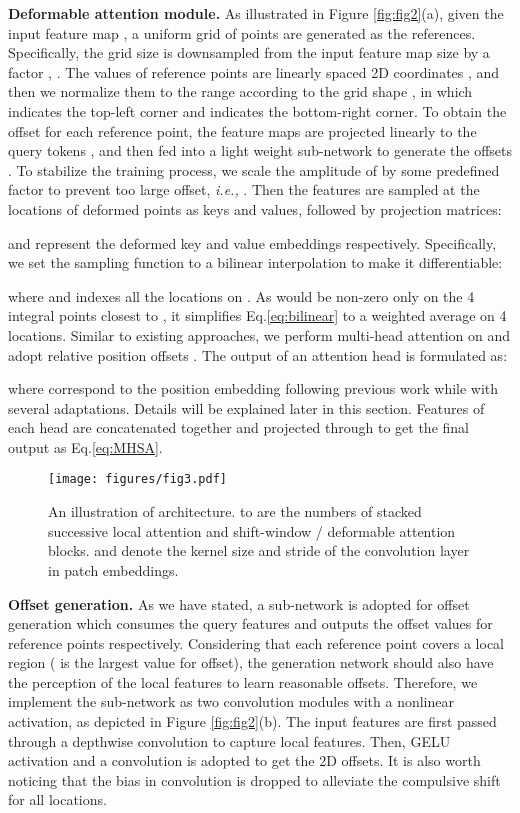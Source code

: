 \noindent
\textbf{Deformable attention module.}
As illustrated in Figure \ref{fig:fig2}(a), given the input feature map , a uniform grid of points  are generated as the references.
Specifically, the grid size is downsampled from the input feature map size by a factor , . The values of reference points are linearly spaced 2D coordinates , and then we normalize them to the range  according to the grid shape , in which  indicates the top-left corner and  indicates the bottom-right corner. To obtain the offset for each reference point, the feature maps are projected linearly to the query tokens ,
and then fed into a light weight sub-network  to generate the offsets .
To stabilize the training process, we scale the amplitude of  by some predefined factor  to prevent too large offset, \textit{i.e.,} . Then the features are sampled at the locations of deformed points as keys and values, followed by projection matrices:

 and  represent the deformed key and value embeddings respectively.
Specifically, we set the sampling function  to a bilinear interpolation to make it differentiable:

where  and  indexes all the locations on . As  would be non-zero only on the 4 integral points closest to , it simplifies Eq.\eqref{eq:bilinear} to a weighted average on 4 locations. 
Similar to existing approaches, we perform multi-head attention on  and adopt relative position offsets . The output of an attention head is formulated as:

where  correspond to the position embedding following previous work \cite{Swin} while with several adaptations. Details will be explained later in this section. Features of each head are concatenated together and projected through  to get the final output  as Eq.\eqref{eq:MHSA}.
\begin{figure*}
    \centering
    \texttt{[image: figures/fig3.pdf]}
    \caption{An illustration of \ourmethod{} architecture.  to  are the numbers of stacked successive local attention and shift-window / deformable attention blocks.  and  denote the kernel size and stride of the convolution layer in patch embeddings. }
    \label{fig:fig3}
\end{figure*}

\noindent
\textbf{Offset generation.} 
As we have stated, a sub-network is adopted for offset generation which consumes the query features and outputs the offset values for reference points respectively. Considering that each reference point covers a local  region ( is the largest value for offset), the generation network should also have the perception of the local features to learn reasonable offsets. Therefore, we implement the sub-network as two convolution modules with a nonlinear activation, as depicted in Figure \ref{fig:fig2}(b). The input features are first passed through a  depthwise convolution to capture local features. Then, GELU activation and a  convolution is adopted to get the 2D offsets. It is also worth noticing that the bias in  convolution is dropped to alleviate the compulsive shift for all locations. 


